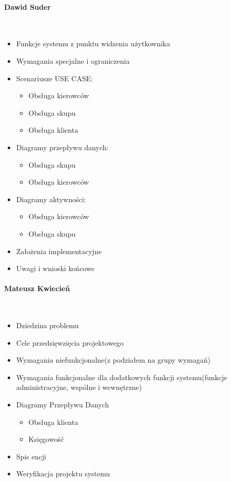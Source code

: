 \documentclass[paper=a4, fontsize=12pt]{scrartcl}
\numberwithin{equation}{section}		%
\numberwithin{figure}{section}			%
\numberwithin{table}{section}				%
\begin{document}
\paragraph{Dawid Suder} \ \\
	\begin{itemize}
		\item Funkcje systemu z punktu widzenia użytkownika
		\item Wymagania specjalne i ograniczenia
		\item Scenariusze USE CASE:
			\begin{itemize}
				\item Obsługa kierowców
				\item Obsługa skupu
				\item Obsługa klienta
			\end{itemize}
		\item  Diagramy przepływu danych:
			\begin{itemize}
				\item Obsługa skupu
				\item Obsługa kierowców
			\end{itemize}
		\item Diagramy aktywności:
			\begin{itemize}
				\item Obsługa kierowców
				\item Obsługa skupu
			\end{itemize}
		\item Założenia implementacyjne
		\item Uwagi i wnioski końcowe
	\end{itemize}

\paragraph{Mateusz Kwiecień} \ \\
	\begin{itemize}
		\item Dziedzina problemu
		\item Cele przedsięwzięcia projektowego
		\item Wymagania niefunkcjonalne(z podziałem na grupy wymagań)
		\item Wymagania funkcjonalne dla dodatkowych funkcji systemu(funkcje administracyjne, wspólne i wewnętrzne)
		\item Diagramy Przepływu Danych
			\begin{itemize} 
				\item Obsługa klienta 
				\item Księgowość
			\end{itemize}
		\item Spis encji
		\item Weryfikacja projektu systemu
	\end{itemize}
\end{document}
